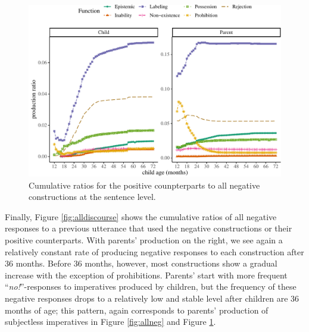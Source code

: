 \documentclass[
  english,
  man,floatsintext]{apa6}
\begin{document}
\begin{figure}[H]

{\centering \includegraphics{neg_construction_article_files/figure-latex/allpos-1} 

}

\caption{Cumulative ratios for the positive counpterparts to all negative constructions at the sentence level.}\label{fig:allpos}
\end{figure}

Finally, Figure \ref{fig:alldiscourse} shows the cumulative ratios of all negative responses to a previous utterance that used the negative constructions or their positive counterparts. With parents' production on the right, we see again a relatively constant rate of producing negative responses to each construction after 36 months. Before 36 months, however, most constructions show a gradual increase with the exception of prohibitions. Parents' start with more frequent ``\emph{no!}''-responses to imperatives produced by children, but the frequency of these negative responses drops to a relatively low and stable level after children are 36 months of age; this pattern, again corresponds to parents' production of subjectless imperatives in Figure \ref{fig:allneg} and Figure \ref{fig:allpos}.
\end{document}
